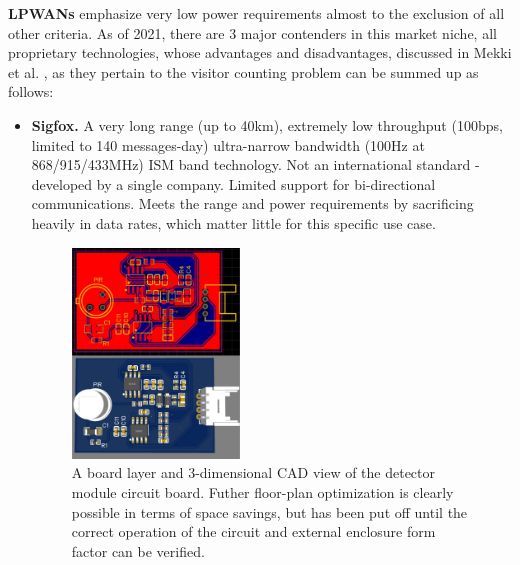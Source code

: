 \documentclass[10pt,nocopyrightspace]{ewsn-proc}
\begin{document}
\textbf{LPWANs} emphasize very low power requirements almost to the exclusion of all other criteria. As of 2021, there are 3 major contenders in this market niche, all proprietary technologies, whose advantages and disadvantages, discussed in Mekki et al. \cite{LPWAN-compare}, as they pertain to the visitor counting problem can be summed up as follows:
\begin{itemize}
\item \textbf{Sigfox.} A very long range (up to 40km), extremely low throughput (100bps, limited to 140 messages-day) ultra-narrow bandwidth (100Hz at 868/915/433MHz) ISM band technology. Not an international standard - developed by a single company. Limited support for bi-directional communications. Meets the range and power requirements by sacrificing heavily in data rates, which matter little for this specific use case. 


\begin{figure}[t!]
\centering
\includegraphics[height=2.2in]{./Images/detector}
\caption{A board layer and 3-dimensional CAD view of the detector module circuit board. Futher floor-plan optimization is clearly possible in terms of space savings, but has been put off until the correct operation of the circuit and external enclosure form factor can be verified.}
\end{figure}




\end{itemize}
\end{document}
